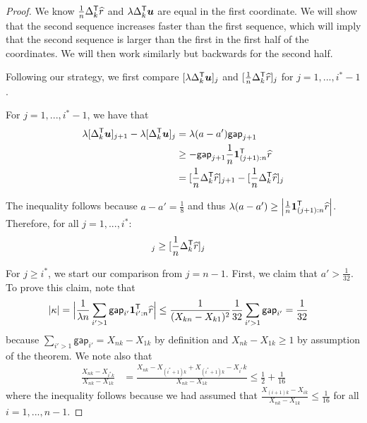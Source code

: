 \begin{proof}
We know $\frac{1}{n} \Delta_k^{\mathsf{T}} \widehat{r}$ and $\lambda \Delta_k^{\mathsf{T}} \mbox{\boldmath $u$}$ are equal in the first coordinate. We will show that the second sequence increases faster than the first sequence, which will imply that the second sequence is larger than the first in the first half of the coordinates. We will then work similarly but backwards for the second half. 


Following our strategy, we first compare $[\lambda \Delta_k^{\mathsf{T}} \mbox{\boldmath $u$}]_j$ and $[\frac{1}{n} \Delta_k^{\mathsf{T}} \widehat{r}]_j$ for $j=1,..., i^*-1$.

For $j = 1,..., i^*-1$, we have that
\begin{align*}
\lambda [ \Delta_k^{\mathsf{T}} \mbox{\boldmath $u$}]_{j+1} - \lambda [ \Delta_k^{\mathsf{T}} \mbox{\boldmath $u$}]_{j} &= \lambda (a - a') \mathsf{gap}_{j+1} \\
 &\geq -\mathsf{gap}_{j+1} \frac{1}{n} \mbox{\boldmath $1$}_{(j+1):n}^{\mathsf{T}} \widehat{r} \\
& = [ \frac{1}{n} \Delta_k^{\mathsf{T}} \widehat{r} ]_{j+1} - [ \frac{1}{n} \Delta_k^{\mathsf{T}} \widehat{r} ]_{j}
\end{align*}

The inequality follows because $a - a' = \frac{1}{8}$ and thus $\lambda (a - a') \geq \left| \frac{1}{n} \mbox{\boldmath $1$}_{(j+1):n}^{\mathsf{T}} \widehat{r} \right|$. Therefore, for all $j = 1,...,i^*$:
\begin{align*}
[ \lambda \Delta_k^\tran \mathbf{u}]_j &\geq [ \frac{1}{n} \Delta_k^\tran \hat{r} ]_j
\end{align*}

For $j \geq i^*$, we start our comparison from $j=n-1$. First, we claim that $a' > \frac{1}{32}$. To prove this claim, note that
\begin{align}
|\kappa| &= \Big|\frac{1}{\lambda n} \sum_{i' > 1} \mathsf{gap}_{i'} \mbox{\boldmath $1$}_{i':n}^{\mathsf{T}} \widehat{r}\Big| \leq \frac{1}{(X_{kn} - X_{k1})^2}\frac{1}{32} \sum_{i' > 1} \mathsf{gap}_{i'} 
 = \frac{1}{32} 
\end{align}
because $\sum_{i'>1} \mathsf{gap}_{i'} = X_{nk} - X_{1k}$ by definition and $X_{nk} - X_{1k} \geq 1$ by assumption of the theorem. We note also that
\begin{align*}
\frac{X_{nk} - X_{i^*k}}{X_{nk} - X_{1k}} &= \frac{X_{nk} - X_{(i^*+1)k} + X_{(i^*+1)k} - X_{i^*}k}{X_{nk} - X_{1k}} \leq \frac{1}{2} + \frac{1}{16}
\end{align*}
where the inequality follows because we had assumed that $\frac{X_{(i+1)k} - X_{ik}}{X_{nk} - X_{1k}} \leq \frac{1}{16}$ for all $i = 1,...,n-1$.


\end{proof}

